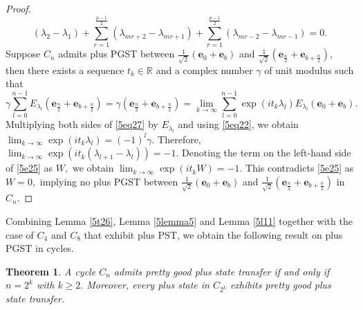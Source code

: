 \documentclass[12pt,a4paper]{article}
\newtheorem{thm}{Theorem}
\def \e {{\bf e}}
\def \e {{\mathbf e}}
\newcommand{\ob}[1]{\left(#1\right)}
\begin{document}
\begin{proof}
  \begin{equation}\label{5e25}
    (\lambda_2-\lambda_1)+\sum_{r=1}^\frac{p-1}{2}(\lambda_{mr+2}-\lambda_{mr+1})+ \sum_{r=1}^\frac{p-1}{2}(\lambda_{mr-2}-\lambda_{mr-1})=0.
 \end{equation}
 Suppose $C_n$ admits plus PGST between $\frac{1}{\sqrt{2}}\ob{\e_0+\e_b}$ and $\frac{1}{\sqrt{2}}\ob{\e_{\frac{n}{2}}+\e_{b+\frac{n}{2}}},$ then there exists a sequence $t_k\in\mathbb{R}$ and a complex number $\gamma$ of unit modulus such that 
\begin{equation}\label{5eq27}
      \gamma \sum_{l=0}^{n-1}E_{\lambda_l}\ob{\e_{\frac{n}{2}}+\e_{b+\frac{n}{2}}}=\gamma\ob{\e_{\frac{n}{2}}+\e_{b+\frac{n}{2}}}=\lim_{k \to \infty}\sum_{l=0}^{n-1}\exp{(it_k\lambda_l)}E_{\lambda_l}\ob{\e_0+\e_b}.
   \end{equation}
 Multiplying both sides of \eqref{5eq27} by $E_{\lambda_l}$ and using \eqref{5eq22}, we obtain  $\displaystyle\lim_{k \to \infty}\exp{(it_k\lambda_l)}=(-1)^l\gamma.$ 
 Therefore, 
$ \displaystyle\lim_{k \to \infty}\exp{(it_k(\lambda_{l+1}-\lambda_l))}=-1. $ Denoting the term on the left-hand side of \eqref{5e25} as $W,$ we obtain  
  $\displaystyle\lim_{k \to \infty}\exp{\ob{it_kW}}=-1.$
  This contradicts \eqref{5e25} as $W=0,$ implying no plus PGST between $\frac{1}{\sqrt{2}}\ob{\e_0+\e_b}$ and $\frac{1}{\sqrt{2}}\ob{\e_{\frac{n}{2}}+\e_{b+\frac{n}{2}}}$ in $C_n$.
\end{proof}
Combining Lemma \ref{5t26}, Lemma \ref{5lemma5} and Lemma \ref{5l11}
together with the case of $C_4$ and $C_8$ that exhibit plus PST, we obtain the following result on plus PGST in cycles.
\begin{thm}\label{5thm9}
    A cycle $C_n$ admits pretty good plus state transfer if and only if $n=2^k$ with $k\geq 2.$ Moreover, every plus state in $C_{2^k}$ exhibits pretty good plus state transfer. 
\end{thm}
\end{document}
